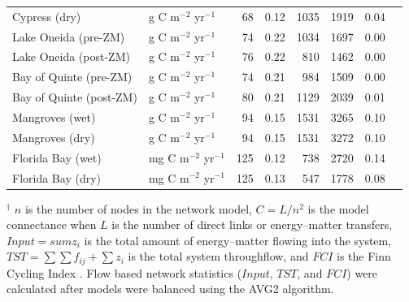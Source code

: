 \documentclass[11pt]{article}
\begin{document}
\begin{table}[ht]
\begin{center}
\begin{tiny}
\begin{tabular}{llrrrrrr}
      Cypress (dry) & g C m$^{-2}$ yr$^{-1}$  &  68 & 0.12 & 1035 & 1919 & 0.04 &  \citet{ulanowicz97_cypress} \\ 
      Lake Oneida (pre-ZM) & g C m$^{-2}$ yr$^{-1}$  &  74 & 0.22 & 1034 & 1697 & 0.00 &  \citet{miehls09_oneida} \\ 
      Lake Oneida (post-ZM) & g C m$^{-2}$ yr$^{-1}$  &  76 & 0.22 & 810 & 1462 & 0.00 &  \citet{miehls09_oneida} \\ 
      Bay of Quinte (pre-ZM) & g C m$^{-2}$ yr$^{-1}$  &  74 & 0.21 & 984 & 1509 & 0.00 &   \citet{miehls09_quinte} \\ 
      Bay of Quinte (post-ZM) & g C m$^{-2}$ yr$^{-1}$  &  80 & 0.21 & 1129 & 2039 & 0.01 &   \citet{miehls09_quinte} \\ 
      Mangroves (wet) & g C m$^{-2}$ yr$^{-1}$  &  94 & 0.15 & 1531 & 3265 & 0.10 &  \citet{ulanowicz99_mangrove} \\ 
      Mangroves (dry) & g C m$^{-2}$ yr$^{-1}$  &  94 & 0.15 & 1531 & 3272 & 0.10 &  \citet{ulanowicz99_mangrove} \\ 
      Florida Bay (wet) & mg C m$^{-2}$ yr$^{-1}$  & 125 & 0.12 & 738 & 2720 & 0.14 &  \citet{ulanowicz98_fb} \\ 
      Florida Bay (dry) & mg C m$^{-2}$ yr$^{-1}$  & 125 & 0.13 & 547 & 1778 & 0.08 &  \citet{ulanowicz98_fb} \\ 
      \hline
\end{tabular}
\end{tiny}
\end{center}
\begin{scriptsize}
  $^\dagger$ $n$ is the number of nodes in the network model,
  $C=L/n^2$ is the model connectance when $L$ is the number of direct
  links or energy--matter transfers, $Input =sum{z_i}$ is the total
  amount of energy--matter flowing into the system,
  $TST=\sum\sum{f_{ij}}+\sum{z_i}$ is the total system throughflow,
  and $FCI$ is the Finn Cycling Index \citep{finn80}. Flow based
  network statistics ($Input$, $TST$, and $FCI$) were calculated after
  models were balanced using the AVG2 algorithm.
\end{scriptsize}
\end{table}
\end{document}
